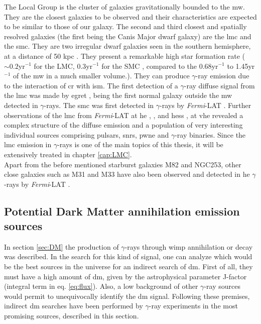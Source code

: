 \documentclass[main.tex]{subfiles}
\begin{document}
The Local Group is the cluster of galaxies gravitationally bounded to the \gls{mw}. They are the closest galaxies to be observed and their characteristics are expected to be similar to those of our galaxy. The second and third closest and spatially resolved galaxies (the first being the Canis Major dwarf galaxy) are the \gls{lmc} and the \gls{smc}. They are two irregular dwarf galaxies seen in the southern hemisphere, at a distance of 50 kpc \cite{2018LMCdistance}. They present a remarkable high star formation rate ($\sim 0.2$yr$^{-1}$ for the LMC, $0.3$yr$^{-1}$ for the SMC \cite{2014LMCSFR}, compared to the 0.68yr$^{-1}$ to 1.45yr$^{-1}$ of the \gls{mw} \cite{2010MilkyWaySFR} in a much smaller volume.). They can produce $\gamma$-ray emission due to the interaction of \gls{cr} with \gls{ism}.
The first detection of a $\gamma$-ray diffuse signal from the \gls{lmc} was made by \gls{egret} \cite{1992LMCEgret}, being the first normal galaxy outside the \gls{mw} detected in $\gamma$-rays. The \gls{smc} was first detected in $\gamma$-rays by \textit{Fermi}-LAT \cite{2010SMCFermi}. Further observations of the \gls{lmc} from \textit{Fermi}-LAT at \gls{he} \cite{2010LMCFermifirst}, \cite{2016LMCFermi6years}, \cite{2016LMCFermiBinary} and \gls{hess} \cite{2015LMCHess}, \cite{2012LMCHessfirst} at \gls{vhe} revealed a complex structure of the diffuse emission and a population of very interesting individual sources comprising pulsars, \glspl{snr}, \gls{pwne} and $\gamma$-ray binaries. Since the \gls{lmc} emission in $\gamma$-rays is one of the main topics of this thesis, it will be extensively treated in chapter \ref{cap:LMC}.\\
Apart from the before mentioned starburst galaxies M82 and NGC253, other close galaxies such as M31 and M33 have also been observed and detected in \gls{he} $\gamma$-rays by \textit{Fermi}-LAT \cite{2017M31M33Fermi}. 

\subsection{Potential Dark Matter annihilation emission sources}

In section \ref{sec:DM} the production of $\gamma$-rays through \gls{wimp} annihilation or decay was described. In the search for this kind of signal, one can analyze which would be the best sources in the universe for an indirect search of \gls{dm}. First of all, they must have a high amount of \gls{dm}, given by the astrophysical parameter J-factor (integral term in eq. \ref{eq:flux}). Also, a low background of other $\gamma$-ray sources would permit to unequivocally identify the \gls{dm} signal. Following these premises, indirect \gls{dm} searches have been performed by $\gamma$-ray experiments in the most promising sources, described in this section.
\end{document}
